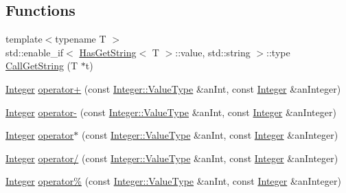\subsection*{Functions}
\begin{DoxyCompactItemize}
\item 
{\footnotesize template$<$typename T $>$ }\\std\+::enable\+\_\+if$<$ \hyperlink{classlibrary_1_1core_1_1types_1_1HasGetString}{Has\+Get\+String}$<$ T $>$\+::value, std\+::string $>$\+::type \hyperlink{namespacelibrary_1_1core_1_1types_a5715d27d021d9d7a6c766a6d3917a96d}{Call\+Get\+String} (T $\ast$t)
\item 
\hyperlink{classlibrary_1_1core_1_1types_1_1Integer}{Integer} \hyperlink{namespacelibrary_1_1core_1_1types_a129fe9eb5778273d662e141e23779fc3}{operator+} (const \hyperlink{classlibrary_1_1core_1_1types_1_1Integer_a623afb1580f870fd8a1997b1c12c917d}{Integer\+::\+Value\+Type} \&an\+Int, const \hyperlink{classlibrary_1_1core_1_1types_1_1Integer}{Integer} \&an\+Integer)
\item 
\hyperlink{classlibrary_1_1core_1_1types_1_1Integer}{Integer} \hyperlink{namespacelibrary_1_1core_1_1types_a6babebcdc3f674f593eb5e1b93b78523}{operator-\/} (const \hyperlink{classlibrary_1_1core_1_1types_1_1Integer_a623afb1580f870fd8a1997b1c12c917d}{Integer\+::\+Value\+Type} \&an\+Int, const \hyperlink{classlibrary_1_1core_1_1types_1_1Integer}{Integer} \&an\+Integer)
\item 
\hyperlink{classlibrary_1_1core_1_1types_1_1Integer}{Integer} \hyperlink{namespacelibrary_1_1core_1_1types_abc5a3a409f7959b3f0130b2cbb7c3310}{operator$\ast$} (const \hyperlink{classlibrary_1_1core_1_1types_1_1Integer_a623afb1580f870fd8a1997b1c12c917d}{Integer\+::\+Value\+Type} \&an\+Int, const \hyperlink{classlibrary_1_1core_1_1types_1_1Integer}{Integer} \&an\+Integer)
\item 
\hyperlink{classlibrary_1_1core_1_1types_1_1Integer}{Integer} \hyperlink{namespacelibrary_1_1core_1_1types_af520df27ed5123ce801e1d397bfd3234}{operator/} (const \hyperlink{classlibrary_1_1core_1_1types_1_1Integer_a623afb1580f870fd8a1997b1c12c917d}{Integer\+::\+Value\+Type} \&an\+Int, const \hyperlink{classlibrary_1_1core_1_1types_1_1Integer}{Integer} \&an\+Integer)
\item 
\hyperlink{classlibrary_1_1core_1_1types_1_1Integer}{Integer} \hyperlink{namespacelibrary_1_1core_1_1types_a8f47532e1d4e458682cf744716ecd6a1}{operator\%} (const \hyperlink{classlibrary_1_1core_1_1types_1_1Integer_a623afb1580f870fd8a1997b1c12c917d}{Integer\+::\+Value\+Type} \&an\+Int, const \hyperlink{classlibrary_1_1core_1_1types_1_1Integer}{Integer} \&an\+Integer)

\end{DoxyCompactItemize}
